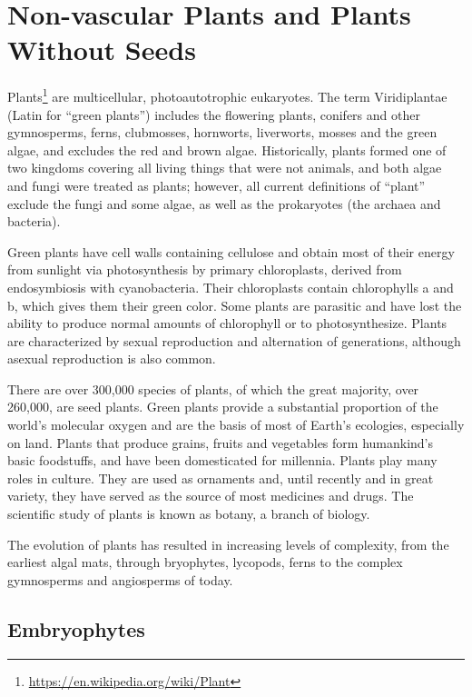 \documentclass[]{book}
\let\rmarkdownfootnote\footnote%
\def\footnote{\protect\rmarkdownfootnote}
\renewcommand{\href}[2]{#2\footnote{\url{#1}}}
\begin{document}
\hypertarget{non-vascular-plants-and-plants-without-seeds}{%
\chapter{Non-vascular Plants and Plants Without Seeds}\label{non-vascular-plants-and-plants-without-seeds}}

\href{https://en.wikipedia.org/wiki/Plant}{Plants} are multicellular, photoautotrophic eukaryotes. The term Viridiplantae (Latin for ``green plants'') includes the flowering plants, conifers and other gymnosperms, ferns, clubmosses, hornworts, liverworts, mosses and the green algae, and excludes the red and brown algae. Historically, plants formed one of two kingdoms covering all living things that were not animals, and both algae and fungi were treated as plants; however, all current definitions of ``plant'' exclude the fungi and some algae, as well as the prokaryotes (the archaea and bacteria).

Green plants have cell walls containing cellulose and obtain most of their energy from sunlight via photosynthesis by primary chloroplasts, derived from endosymbiosis with cyanobacteria. Their chloroplasts contain chlorophylls a and b, which gives them their green color. Some plants are parasitic and have lost the ability to produce normal amounts of chlorophyll or to photosynthesize. Plants are characterized by sexual reproduction and alternation of generations, although asexual reproduction is also common.

There are over 300,000 species of plants, of which the great majority, over 260,000, are seed plants. Green plants provide a substantial proportion of the world's molecular oxygen and are the basis of most of Earth's ecologies, especially on land. Plants that produce grains, fruits and vegetables form humankind's basic foodstuffs, and have been domesticated for millennia. Plants play many roles in culture. They are used as ornaments and, until recently and in great variety, they have served as the source of most medicines and drugs. The scientific study of plants is known as botany, a branch of biology.

The evolution of plants has resulted in increasing levels of complexity, from the earliest algal mats, through bryophytes, lycopods, ferns to the complex gymnosperms and angiosperms of today.

\hypertarget{embryophytes}{%
\section{Embryophytes}\label{embryophytes}}
\end{document}
